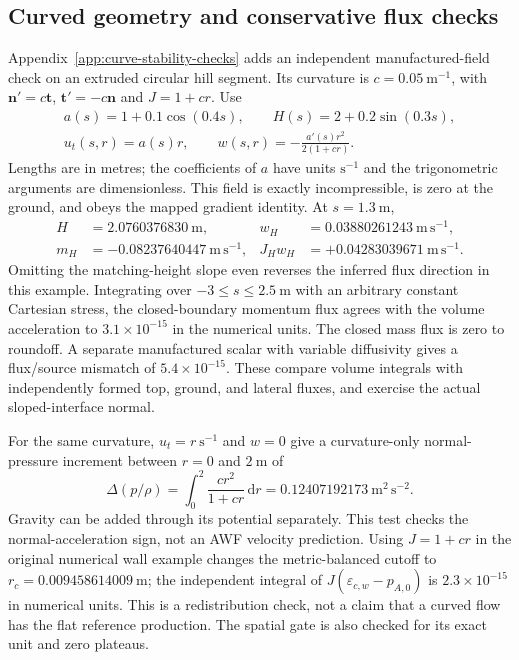 \documentclass[11pt,a4paper]{article}
\numberwithin{equation}{section}
\newcommand{\dd}{\mathrm{d}}
\newcommand{\eps}{\varepsilon}
\newcommand{\ECw}{\eps_{c,w}}
\begin{document}
\subsection{Curved geometry and conservative flux checks}
\label{sec:curve-numerical}
Appendix~\ref{app:curve-stability-checks} adds an independent
manufactured-field check on an extruded circular hill segment. Its
curvature is $c=0.05\ \mathrm{m^{-1}}$, with
$\bm n'=c\bm t$, $\bm t'=-c\bm n$ and $J=1+cr$. Use
\begin{equation}
 \begin{gathered}
 a(s)=1+0.1\cos(0.4s),\qquad
 H(s)=2+0.2\sin(0.3s),\\
 u_t(s,r)=a(s)r,\qquad
 w(s,r)=-\frac{a'(s)r^2}{2(1+cr)}.
 \end{gathered}
 \label{eq:curve-test-field}
\end{equation}
Lengths are in metres; the coefficients of $a$ have units
$\mathrm{s^{-1}}$ and the trigonometric arguments are dimensionless.
This field is exactly incompressible, is zero at the ground, and
obeys the mapped gradient identity. At $s=1.3\ \mathrm m$,
\begin{equation}
 \begin{aligned}
 H&=2.0760376830\ \mathrm m,&
 w_H&=0.03880261243\ \mathrm{m\,s^{-1}},\\
 m_H&=-0.08237640447\ \mathrm{m\,s^{-1}},&
 J_Hw_H&=+0.04283039671\ \mathrm{m\,s^{-1}}.
 \end{aligned}
 \label{eq:curve-test-mass}
\end{equation}
Omitting the matching-height slope even reverses the inferred flux
direction in this example. Integrating over
$-3\leq s\leq2.5\ \mathrm m$ with an arbitrary constant Cartesian
stress, the closed-boundary momentum flux agrees with the volume
acceleration to $3.1\times10^{-15}$ in the numerical units. The
closed mass flux is zero to roundoff. A separate manufactured scalar
with variable diffusivity gives a flux/source mismatch of
$5.4\times10^{-15}$. These compare volume integrals with independently
formed top, ground, and lateral fluxes, and exercise the actual
sloped-interface normal.

For the same curvature, $u_t=r\ \mathrm{s^{-1}}$ and $w=0$ give a
curvature-only normal-pressure increment between $r=0$ and $2\ \mathrm m$
of
\begin{equation}
 \Delta(p/\rho)=\int_0^2\frac{cr^2}{1+cr}\,\dd r
 =0.12407192173\ \mathrm{m^2\,s^{-2}}.
 \label{eq:curve-test-pressure}
\end{equation}
Gravity can be added through its potential separately. This test
checks the normal-acceleration sign, not an AWF velocity prediction.
Using $J=1+cr$ in the original numerical wall example changes the
metric-balanced cutoff to $r_c=0.009458614009\ \mathrm m$; the
independent integral of $J(\ECw-p_{A,0})$ is
$2.3\times10^{-15}$ in numerical units. This is a redistribution
check, not a claim that a curved flow has the flat reference production.
The spatial gate is also checked for its exact unit and zero plateaus.
\end{document}
